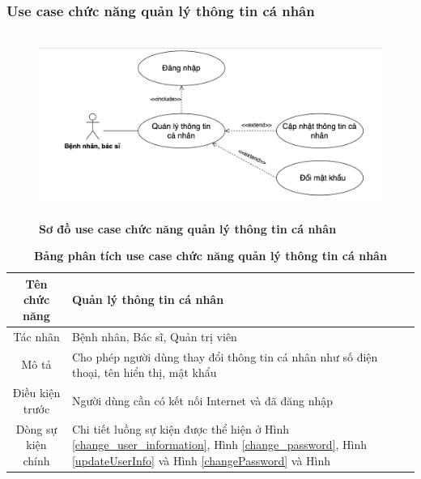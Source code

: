 \subsubsection{Use case chức năng quản lý thông tin cá nhân}
  \begin{figure}[H]
    \centering
    \includegraphics[width=15cm,height=6cm]{Images/use_case/use_case_manage_info.png}
    \caption[Sơ đồ use case chức năng quản lý thông tin cá nhân]{\bfseries \fontsize{12pt}{0pt}
    \selectfont Sơ đồ use case chức năng quản lý thông tin cá nhân}
    \label{use_case_manage_info} %
  \end{figure}

  \begin{table}[H]
    \caption{\bfseries \fontsize{12pt}{0pt}\selectfont Bảng phân tích use case chức năng quản lý thông tin cá nhân}
    \centering
    \begin{tabularx}{0.9\textwidth}{|c|X|}
      \hline
      \textbf{Tên chức năng} & \textbf{Quản lý thông tin cá nhân} \\
      \hline
      Tác nhân & Bệnh nhân, Bác sĩ, Quản trị viên \\
      \hline
      Mô tả & Cho phép người dùng thay đổi thông tin cá nhân như số điện thoại, tên hiển thị, mật khẩu \\
      \hline
      Điều kiện trước & Người dùng cần có kết nối Internet và đã đăng nhập \\
      \hline
      Dòng sự kiện chính & 
        Chi tiết luồng sự kiện được thể hiện ở Hình \ref{change_user_information}, Hình \ref{change_password}, 
        Hình \ref{updateUserInfo} và Hình \ref{changePassword}
        và Hình\\
      \hline
    \end{tabularx}
  \end{table}

